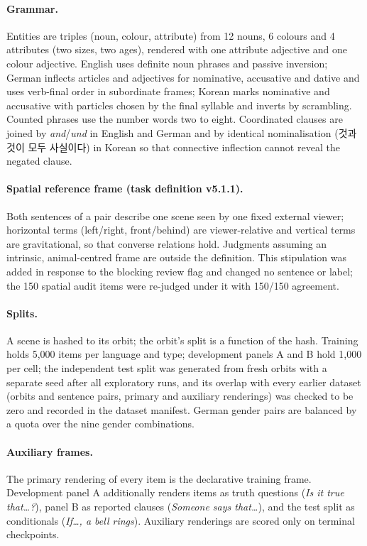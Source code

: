 \documentclass[preprint,12pt,authoryear]{elsarticle}
\begin{document}
\paragraph{Grammar.} Entities are triples (noun, colour, attribute) from 12 nouns, 6 colours and 4 attributes (two sizes, two ages), rendered with one attribute adjective and one colour adjective. English uses definite noun phrases and passive inversion; German inflects articles and adjectives for nominative, accusative and dative and uses verb-final order in subordinate frames; Korean marks nominative and accusative with particles chosen by the final syllable and inverts by scrambling. Counted phrases use the number words two to eight. Coordinated clauses are joined by \emph{and}/\emph{und} in English and German and by identical nominalisation ( 것과  것이 모두 사실이다) in Korean so that connective inflection cannot reveal the negated clause.

\paragraph{Spatial reference frame (task definition v5.1.1).} Both sentences of a pair describe one scene seen by one fixed external viewer; horizontal terms (left/right, front/behind) are viewer-relative and vertical terms are gravitational, so that converse relations hold. Judgments assuming an intrinsic, animal-centred frame are outside the definition. This stipulation was added in response to the blocking review flag and changed no sentence or label; the 150 spatial audit items were re-judged under it with 150/150 agreement.

\paragraph{Splits.} A scene is hashed to its orbit; the orbit's split is a function of the hash. Training holds 5{,}000 items per language and type; development panels A and B hold 1{,}000 per cell; the independent test split was generated from fresh orbits with a separate seed after all exploratory runs, and its overlap with every earlier dataset (orbits and sentence pairs, primary and auxiliary renderings) was checked to be zero and recorded in the dataset manifest. German gender pairs are balanced by a quota over the nine gender combinations.

\paragraph{Auxiliary frames.} The primary rendering of every item is the declarative training frame. Development panel A additionally renders items as truth questions (\emph{Is it true that\ldots?}), panel B as reported clauses (\emph{Someone says that\ldots}), and the test split as conditionals (\emph{If\ldots, a bell rings}). Auxiliary renderings are scored only on terminal checkpoints.
\end{document}
